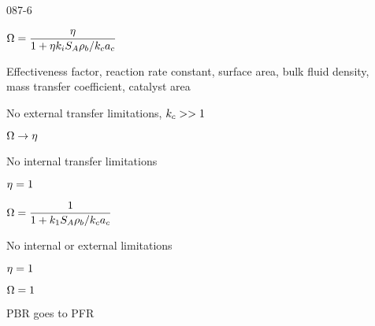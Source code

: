 \begin{mitframe}{087-6}

   
\begin{listone}
	\item $\mpc=\dfrac{\intrinsvisc}{1+\intrinsvisc\thermcond_{\state}\entropy_{\helmholtz}\dens_b/\thermcond_c\activity_c}$
	\begin{listtwo}
    	\item Effectiveness factor, reaction rate constant, surface area, bulk fluid density, \\mass transfer coefficient, catalyst area
                
		\item No external transfer limitations, $\thermcond_c>>1$
                
		\begin{listthree}
        	\item $\mpc\rightarrow\intrinsvisc$                    
		\end{listthree}
        
        \item No internal transfer limitations
		
        \begin{listthree}
			\item $\intrinsvisc=1$
			\item $\mpc=\dfrac{1}{1+\thermcond_1\entropy_{\helmholtz}\dens_b/\thermcond_c\activity_c}$
		\end{listthree}
                        
        \item No internal or external limitations
            
		\begin{listthree}
			\item $\intrinsvisc=1$
         	\item $\mpc=1$
            \item PBR goes to PFR
		\end{listthree}
	\end{listtwo}        
\end{listone}

\end{mitframe}
